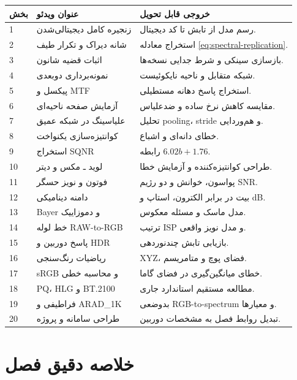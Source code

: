\begin{videobox}
\begin{longtable}{p{}p{}p{}}
\toprule
بخش & عنوان ویدئو & خروجی قابل تحویل\\
\midrule
1 & زنجیره کامل دیجیتالی‌شدن & رسم مدل از تابش تا کد دیجیتال.\\
2 & شانه دیراک و تکرار طیف & استخراج معادله \eqref{eq:spectral-replication}.\\
3 & اثبات قضیه شانون & بازسازی سینکی و شرط جدایی نسخه‌ها.\\
4 & نمونه‌برداری دوبعدی & شبکه متقابل و ناحیه نایکوئیست.\\
5 & پیکسل و MTF & استخراج پاسخ دهانه مستطیلی.\\
6 & آزمایش صفحه ناحیه‌ای & مقایسه کاهش نرخ ساده و ضدعلیاس.\\
7 & علیاسینگ در شبکه عمیق & تحلیل pooling، stride و هم‌وردایی.\\
8 & کوانتیزه‌سازی یکنواخت & خطای دانه‌ای و اشباع.\\
9 & استخراج SQNR & رابطه \(6.02b+1.76\).\\
10 & لوید ـ مکس و دیتر & طراحی کوانتیزه‌کننده و آزمایش خطا.\\
11 & فوتون و نویز حسگر & پواسون، خوانش و دو رژیم SNR.\\
12 & دامنه دینامیکی & بیت در برابر الکترون، استاپ و dB.\\
13 & Bayer و دموزاییک & مدل ماسک و مسئله معکوس.\\
14 & خط لوله RAW-to-RGB & ترتیب ISP و مدل نویز واقعی.\\
15 & پاسخ دوربین و HDR & بازیابی تابش چندنوردهی.\\
16 & ریاضیات رنگ‌سنجی & XYZ، فضای پوچ و متامریسم.\\
17 & sRGB و محاسبه خطی & خطای میانگین‌گیری در فضای گاما.\\
18 & PQ، HLG و BT.2100 & مطالعه مستقیم استاندارد جاری.\\
19 & فراطیفی و ARAD\_1K & بدوضعی RGB-to-spectrum و معیارها.\\
20 & طراحی سامانه و پروژه & تبدیل روابط فصل به مشخصات دوربین.\\
\bottomrule
\end{longtable}
\end{videobox}

\section{خلاصه دقیق فصل}

